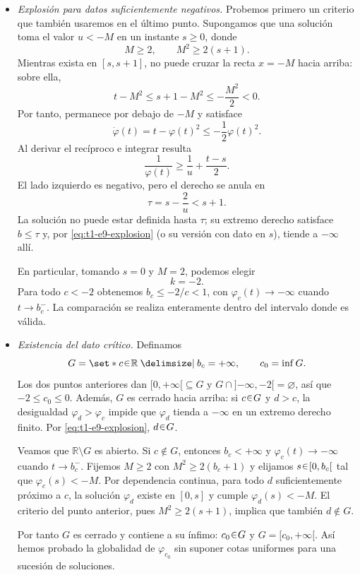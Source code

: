 \begin{sol}
\begin{enumerate}[label = (\alph*)]
\begin{itemize}
        \item \emph{Explosión para datos suficientemente negativos.}
        Probemos primero un criterio que también usaremos en el último punto. Supongamos que una solución toma el valor $u<-M$ en un instante $s\geq0$, donde
        \[
            M\geq2,\qquad M^2\geq2(s+1).
        \]
        Mientras exista en $[s,s+1]$, no puede cruzar la recta $x=-M$ hacia arriba: sobre ella,
        \[
            t-M^2\leq s+1-M^2\leq-\frac{M^2}{2}<0.
        \]
        Por tanto, permanece por debajo de $-M$ y satisface
        \[
            \dot\varphi(t)=t-\varphi(t)^2
            \leq-\frac12\varphi(t)^2.
        \]
        Al derivar el recíproco e integrar resulta
        \[
            \frac{1}{\varphi(t)}
            \geq\frac1u+\frac{t-s}{2}.
        \]
        El lado izquierdo es negativo, pero el derecho se anula en
        \[
            \tau=s-\frac2u<s+1.
        \]
        La solución no puede estar definida hasta $\tau$; su extremo derecho satisface $b\leq\tau$ y, por \eqref{eq:t1-e9-explosion} (o su versión con dato en $s$), tiende a $-\infty$ allí.

        En particular, tomando $s=0$ y $M=2$, podemos elegir
        \[
            k=-2.
        \]
        Para todo $c<-2$ obtenemos $b_c\leq-2/c<1$, con $\varphi_c(t)\to-\infty$ cuando $t\to b_c^-$. La comparación se realiza enteramente dentro del intervalo donde es válida.

        \item \emph{Existencia del dato crítico.}
        Definamos
        \[
            G=\set*{c\en\mathbb R\given b_c=+\infty},
            \qquad c_0=\inf G.
        \]
        Los dos puntos anteriores dan $[0,+\infty[\subseteq G$ y $G\cap{]{-\infty},-2[}=\varnothing$, así que $-2\leq c_0\leq0$. Además, $G$ es cerrado hacia arriba: si $c\en G$ y $d>c$, la desigualdad $\varphi_d>\varphi_c$ impide que $\varphi_d$ tienda a $-\infty$ en un extremo derecho finito. Por \eqref{eq:t1-e9-explosion}, $d\en G$.

        Veamos que $\mathbb R\setminus G$ es abierto. Si $c\notin G$, entonces $b_c<+\infty$ y $\varphi_c(t)\to-\infty$ cuando $t\to b_c^-$. Fijemos $M\geq2$ con $M^2\geq2(b_c+1)$ y elijamos $s\en[0,b_c[$ tal que $\varphi_c(s)<-M$. Por dependencia continua, para todo $d$ suficientemente próximo a $c$, la solución $\varphi_d$ existe en $[0,s]$ y cumple $\varphi_d(s)<-M$. El criterio del punto anterior, pues $M^2\geq2(s+1)$, implica que también $d\notin G$.

        Por tanto $G$ es cerrado y contiene a su ínfimo: $c_0\en G$ y $G=[c_0,+\infty[$. Así hemos probado la globalidad de $\varphi_{c_0}$ sin suponer cotas uniformes para una sucesión de soluciones.


\end{itemize}
\end{enumerate}
\end{sol}
